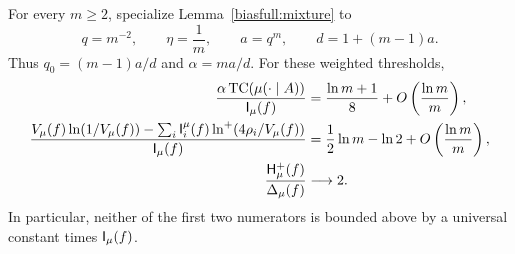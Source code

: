 \begin{theorem}
\label{biasfull:weightedcounter}
For every \(m\ge2\), specialize Lemma~\ref{biasfull:mixture} to
\[
 q=m^{-2},\qquad \eta=\frac1m,\qquad
 a=q^m,\qquad d=1+(m-1)a.
\]
Thus \(q_0=(m-1)a/d\) and \(\alpha=ma/d\).
For these weighted thresholds,
\begin{align}
 \frac{\alpha\operatorname{TC}(\mu(\cdot\mid A))}{\mathsf I_\mu(f)}
   &=\frac{\ln m+1}{8}
        +O\left(\frac{\ln m}{m}\right),\label{biasfull:weightedTC}\\
 \frac{V_\mu(f)\ln(1/V_\mu(f))
            -\sum_i\mathsf I_i^\mu(f)\ln^+(4\rho_i/V_\mu(f))}
        {\mathsf I_\mu(f)}
   &=\frac12\ln m-\ln2
        +O\left(\frac{\ln m}{m}\right),\label{biasfull:weightedcredit}\\
 \frac{\mathsf H_\mu^+(f)}{\Delta_\mu(f)}
   &\longrightarrow2.\label{biasfull:weightedratio}
\end{align}
In particular, neither of the first two numerators is bounded above
by a universal constant times \(\mathsf I_\mu(f)\).
\end{theorem}
